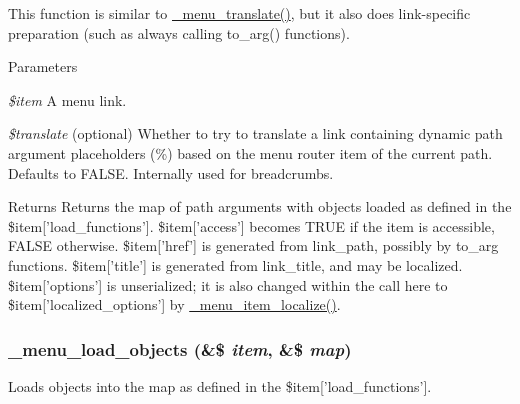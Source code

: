 This function is similar to \hyperlink{group__menu_ga0e8535f35bcd1a03e71120a2d6ecc099}{\_\-menu\_\-translate()}, but it also does link-\/specific preparation (such as always calling to\_\-arg() functions).


\begin{DoxyParams}{Parameters}
\item[{\em \$item}]A menu link. \item[{\em \$translate}](optional) Whether to try to translate a link containing dynamic path argument placeholders (\%) based on the menu router item of the current path. Defaults to FALSE. Internally used for breadcrumbs.\end{DoxyParams}
\begin{DoxyReturn}{Returns}
Returns the map of path arguments with objects loaded as defined in the \$item\mbox{[}'load\_\-functions'\mbox{]}. \$item\mbox{[}'access'\mbox{]} becomes TRUE if the item is accessible, FALSE otherwise. \$item\mbox{[}'href'\mbox{]} is generated from link\_\-path, possibly by to\_\-arg functions. \$item\mbox{[}'title'\mbox{]} is generated from link\_\-title, and may be localized. \$item\mbox{[}'options'\mbox{]} is unserialized; it is also changed within the call here to \$item\mbox{[}'localized\_\-options'\mbox{]} by \hyperlink{group__menu_ga3b0c0f37db66372ac4e90afa35b191e9}{\_\-menu\_\-item\_\-localize()}. 
\end{DoxyReturn}
\hypertarget{group__menu_ga8aeba67f5ade33d997f9869ce3e41fa6}{
\subsubsection[{\_\-menu\_\-load\_\-objects}]{\setlength{\rightskip}{0pt plus 5cm}\_\-menu\_\-load\_\-objects (\&\$ {\em item}, \/  \&\$ {\em map})}}
\label{group__menu_ga8aeba67f5ade33d997f9869ce3e41fa6}
Loads objects into the map as defined in the \$item\mbox{[}'load\_\-functions'\mbox{]}.


